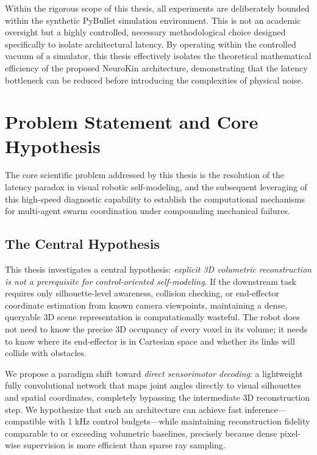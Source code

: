 \documentclass[12pt,a4paper,oneside]{report}
\begin{document}
Within the rigorous scope of this thesis, all experiments are deliberately bounded within the synthetic PyBullet simulation environment. This is not an academic oversight but a highly controlled, necessary methodological choice designed specifically to isolate architectural latency. By operating within the controlled vacuum of a simulator, this thesis effectively isolates the theoretical mathematical efficiency of the proposed NeuroKin architecture, demonstrating that the latency bottleneck can be reduced before introducing the complexities of physical noise.

\section{Problem Statement and Core Hypothesis}
\label{sec:problem_hypothesis}

The core scientific problem addressed by this thesis is the resolution of the latency paradox in visual robotic self-modeling, and the subsequent leveraging of this high-speed diagnostic capability to establish the computational mechanisms for multi-agent swarm coordination under compounding mechanical failures.

\subsection{The Central Hypothesis}
\label{subsec:central_hypothesis}

This thesis investigates a central hypothesis: \textit{explicit 3D volumetric reconstruction is not a prerequisite for control-oriented self-modeling}. If the downstream task requires only silhouette-level awareness, collision checking, or end-effector coordinate estimation from known camera viewpoints, maintaining a dense, queryable 3D scene representation is computationally wasteful. The robot does not need to know the precise 3D occupancy of every voxel in its volume; it needs to know where its end-effector is in Cartesian space and whether its links will collide with obstacles.

We propose a paradigm shift toward \textit{direct sensorimotor decoding}: a lightweight fully convolutional network that maps joint angles directly to visual silhouettes and spatial coordinates, completely bypassing the intermediate 3D reconstruction step. We hypothesize that such an architecture can achieve fast inference—compatible with 1 kHz control budgets—while maintaining reconstruction fidelity comparable to or exceeding volumetric baselines, precisely because dense pixel-wise supervision is more efficient than sparse ray sampling.
\end{document}
